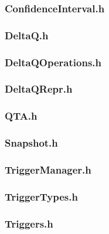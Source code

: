 \subsubsection*{ConfidenceInterval.h}


\subsubsection*{DeltaQ.h}


\subsubsection*{DeltaQOperations.h}


\subsubsection*{DeltaQRepr.h}


\subsubsection*{QTA.h}


\subsubsection*{Snapshot.h}


\subsubsection*{TriggerManager.h}


\subsubsection*{TriggerTypes.h}


\subsubsection*{Triggers.h}


